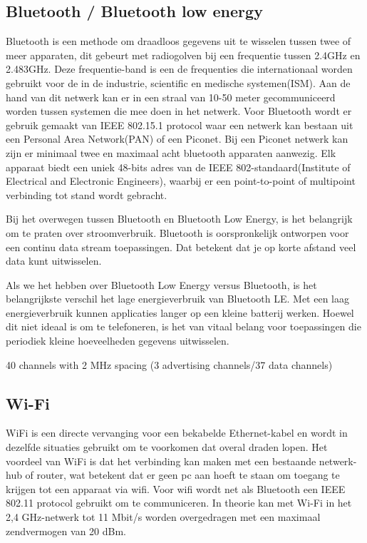 \subsection{Bluetooth / Bluetooth low energy}
Bluetooth is een methode om draadloos gegevens uit te wisselen tussen twee of meer apparaten, dit gebeurt met radiogolven bij een frequentie tussen 2.4GHz en 2.483GHz. Deze frequentie-band is een de frequenties die internationaal worden gebruikt voor de in de industrie, scientific en medische systemen(ISM). Aan de hand van dit netwerk kan er in een straal van 10-50 meter gecommuniceerd worden tussen systemen die mee doen in het netwerk. Voor Bluetooth wordt er gebruik gemaakt van IEEE 802.15.1 protocol waar een netwerk kan bestaan uit een Personal Area Network(PAN) of een Piconet. Bij een Piconet netwerk kan zijn er minimaal twee en maximaal acht bluetooth apparaten aanwezig. Elk apparaat biedt een uniek 48-bits adres van de IEEE 802-standaard(Institute of Electrical and Electronic Engineers), waarbij er een point-to-point of multipoint verbinding tot stand wordt gebracht.\cite{wireless_types}

Bij het overwegen tussen Bluetooth en Bluetooth Low Energy, is het belangrijk om te praten over stroomverbruik. Bluetooth is oorspronkelijk ontworpen voor een continu data stream toepassingen. Dat betekent dat je op korte afstand veel data kunt uitwisselen.

Als we het hebben over Bluetooth Low Energy versus Bluetooth, is het belangrijkste verschil het lage energieverbruik van Bluetooth LE. Met een laag energieverbruik kunnen applicaties langer op een kleine batterij werken. Hoewel dit niet ideaal is om te telefoneren, is het van vitaal belang voor toepassingen die periodiek kleine hoeveelheden gegevens uitwisselen.

40 channels with 2 MHz spacing (3 advertising channels/37 data channels)


\subsection{Wi-Fi}
WiFi is een directe vervanging voor een bekabelde Ethernet-kabel en wordt in dezelfde situaties gebruikt om te voorkomen dat overal draden lopen. Het voordeel van WiFi is dat het verbinding kan maken met een bestaande netwerk-hub of router, wat betekent dat er geen pc aan hoeft te staan om toegang te krijgen tot een apparaat via wifi. Voor wifi wordt net als Bluetooth een IEEE 802.11 protocol gebruikt om te communiceren. In theorie kan met Wi-Fi in het 2,4 GHz-netwerk tot 11 Mbit/s worden overgedragen met een maximaal zendvermogen van 20 dBm.


